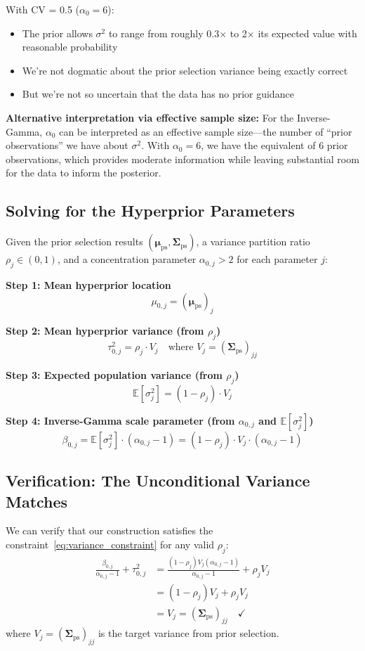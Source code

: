 \documentclass[11pt]{article}
\newcommand{\E}{\mathbb{E}}
\begin{document}
With CV = 0.5 ($\alpha_0 = 6$):
\begin{itemize}
  \item The prior allows $\sigma^2$ to range from roughly 0.3$\times$ to 2$\times$ its expected value with reasonable probability
  \item We're not dogmatic about the prior selection variance being exactly correct
  \item But we're not so uncertain that the data has no prior guidance
\end{itemize}

\textbf{Alternative interpretation via effective sample size:} For the Inverse-Gamma, $\alpha_0$ can be interpreted as an effective sample size---the number of ``prior observations'' we have about $\sigma^2$. With $\alpha_0 = 6$, we have the equivalent of 6 prior observations, which provides moderate information while leaving substantial room for the data to inform the posterior.

\subsection{Solving for the Hyperprior Parameters}

Given the prior selection results $(\boldsymbol{\mu}_{\text{ps}}, \boldsymbol{\Sigma}_{\text{ps}})$, a variance partition ratio $\rho_j \in (0,1)$, and a concentration parameter $\alpha_{0,j} > 2$ for each parameter $j$:

\textbf{Step 1: Mean hyperprior location}
\[
  \mu_{0,j} = (\boldsymbol{\mu}_{\text{ps}})_j
\]

\textbf{Step 2: Mean hyperprior variance (from $\rho_j$)}
\[
  \tau_{0,j}^2 = \rho_j \cdot V_j \quad \text{where } V_j = (\boldsymbol{\Sigma}_{\text{ps}})_{jj}
\]

\textbf{Step 3: Expected population variance (from $\rho_j$)}
\[
  \E[\sigma_j^2] = (1 - \rho_j) \cdot V_j
\]

\textbf{Step 4: Inverse-Gamma scale parameter (from $\alpha_{0,j}$ and $\E[\sigma_j^2]$)}
\[
  \beta_{0,j} = \E[\sigma_j^2] \cdot (\alpha_{0,j} - 1) = (1 - \rho_j) \cdot V_j \cdot (\alpha_{0,j} - 1)
\]

\subsection{Verification: The Unconditional Variance Matches}

We can verify that our construction satisfies the constraint~\eqref{eq:variance_constraint} for any valid $\rho_j$:
\begin{align*}
  \frac{\beta_{0,j}}{\alpha_{0,j} - 1} + \tau_{0,j}^2 &= \frac{(1-\rho_j) V_j (\alpha_{0,j} - 1)}{\alpha_{0,j} - 1} + \rho_j V_j \\
  &= (1 - \rho_j) V_j + \rho_j V_j \\
  &= V_j = (\boldsymbol{\Sigma}_{\text{ps}})_{jj} \quad \checkmark
\end{align*}
where $V_j = (\boldsymbol{\Sigma}_{\text{ps}})_{jj}$ is the target variance from prior selection.
\end{document}
